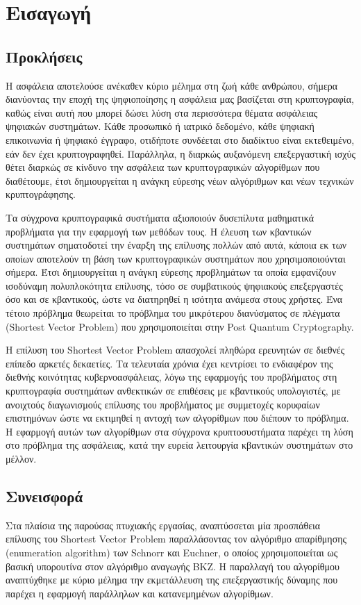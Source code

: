 \section{Εισαγωγή}
\label{chapIntro}

\subsection{Προκλήσεις}

Η ασφάλεια αποτελούσε ανέκαθεν κύριο μέλημα στη ζωή κάθε ανθρώπου, σήμερα διανύοντας την εποχή της ψηφιοποίησης η ασφάλεια μας βασίζεται στη κρυπτογραφία, καθώς είναι αυτή που μπορεί δώσει λύση στα περισσότερα θέματα ασφάλειας ψηφιακών συστημάτων. Κάθε προσωπικό ή ιατρικό δεδομένο, κάθε ψηφιακή επικοινωνία ή ψηφιακό έγγραφο, οτιδήποτε συνδέεται στο διαδίκτυο είναι εκτεθειμένο, εάν δεν έχει κρυπτογραφηθεί. Παράλληλα, η διαρκώς αυξανόμενη επεξεργαστική ισχύς θέτει διαρκώς σε κίνδυνο την ασφάλεια των κρυπτογραφικών αλγορίθμων που διαθέτουμε,
 έτσι δημιουργείται η ανάγκη εύρεσης νέων αλγόριθμων και νέων τεχνικών κρυπτογράφησης.  

Τα σύγχρονα κρυπτογραφικά συστήματα αξιοποιούν δυσεπίλυτα μαθηματικά προβλήματα για την εφαρμογή των μεθόδων τους. Η έλευση των κβαντικών συστημάτων σηματοδοτεί την έναρξη της επίλυσης πολλών από αυτά, κάποια εκ των οποίων αποτελούν τη βάση των κρυπτογραφικών συστημάτων που χρησιμοποιούνται σήμερα. Έτσι δημιουργείται η ανάγκη εύρεσης προβλημάτων τα οποία εμφανίζουν ισοδύναμη πολυπλοκότητα επίλυσης, τόσο σε συμβατικούς ψηφιακούς επεξεργαστές όσο και σε κβαντικούς, ώστε να διατηρηθεί η ισότητα ανάμεσα στους χρήστες. Ένα τέτοιο πρόβλημα θεωρείται το πρόβλημα του μικρότερου διανύσματος σε πλέγματα (\lt Shortest Vector Problem) που χρησιμοποιείται στην Post Quantum Cryptography.

Η επίλυση του Shortest Vector Problem απασχολεί πληθώρα ερευνητών σε διεθνές επίπεδο αρκετές δεκαετίες. Τα τελευταία χρόνια έχει κεντρίσει το ενδιαφέρον της διεθνής κοινότητας κυβερνοασφάλειας, λόγω της εφαρμογής του προβλήματος στη κρυπτογραφία συστημάτων ανθεκτικών σε επιθέσεις με κβαντικούς υπολογιστές, με ανοιχτούς διαγωνισμούς επίλυσης του προβλήματος με συμμετοχές κορυφαίων επιστημόνων 
ώστε να εκτιμηθεί η αντοχή των αλγορίθμων που διέπουν το πρόβλημα. Η εφαρμογή αυτών των αλγορίθμων στα σύγχρονα κρυπτοσυστήματα παρέχει τη λύση στο πρόβλημα της ασφάλειας,
 κατά την ευρεία λειτουργία κβαντικών συστημάτων στο μέλλον.

\subsection{Συνεισφορά}
Στα πλαίσια της παρούσας πτυχιακής εργασίας, αναπτύσσεται μία προσπάθεια επίλυσης του Shortest Vector Problem παραλλάσοντας τον αλγόριθμο απαρίθμησης (enumeration algorithm) των Schnorr και Euchner, ο οποίος χρησιμοποιείται ως βασική υπορουτίνα στον αλγόριθμο αναγωγής BKZ. Η παραλλαγή του αλγορίθμου αναπτύχθηκε με κύριο μέλημα την εκμετάλλευση της επεξεργαστικής δύναμης 
 που παρέχει η εφαρμογή παράλληλων και κατανεμημένων αλγορίθμων. 

